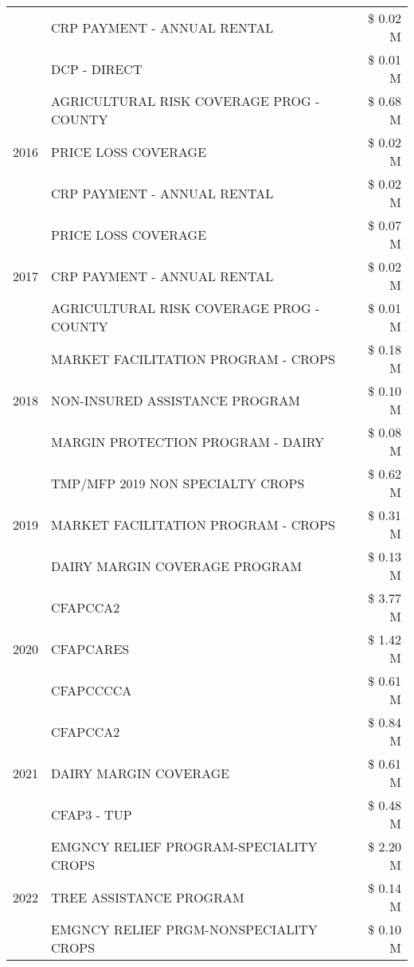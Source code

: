 \begin{tabular}{llr}
 & CRP PAYMENT - ANNUAL RENTAL & \$ 0.02 M \\
 & DCP - DIRECT & \$ 0.01 M \\
\cline{1-3}
\multirow[t]{3}{*}{2016} & AGRICULTURAL RISK COVERAGE PROG - COUNTY & \$ 0.68 M \\
 & PRICE LOSS COVERAGE & \$ 0.02 M \\
 & CRP PAYMENT - ANNUAL RENTAL & \$ 0.02 M \\
\cline{1-3}
\multirow[t]{3}{*}{2017} & PRICE LOSS COVERAGE & \$ 0.07 M \\
 & CRP PAYMENT - ANNUAL RENTAL & \$ 0.02 M \\
 & AGRICULTURAL RISK COVERAGE PROG - COUNTY & \$ 0.01 M \\
\cline{1-3}
\multirow[t]{3}{*}{2018} & MARKET FACILITATION PROGRAM - CROPS & \$ 0.18 M \\
 & NON-INSURED ASSISTANCE PROGRAM & \$ 0.10 M \\
 & MARGIN PROTECTION PROGRAM - DAIRY & \$ 0.08 M \\
\cline{1-3}
\multirow[t]{3}{*}{2019} & TMP/MFP 2019 NON SPECIALTY CROPS & \$ 0.62 M \\
 & MARKET FACILITATION PROGRAM - CROPS & \$ 0.31 M \\
 & DAIRY MARGIN COVERAGE PROGRAM & \$ 0.13 M \\
\cline{1-3}
\multirow[t]{3}{*}{2020} & CFAPCCA2 & \$ 3.77 M \\
 & CFAPCARES & \$ 1.42 M \\
 & CFAPCCCCA & \$ 0.61 M \\
\cline{1-3}
\multirow[t]{3}{*}{2021} & CFAPCCA2 & \$ 0.84 M \\
 & DAIRY MARGIN COVERAGE & \$ 0.61 M \\
 & CFAP3 - TUP & \$ 0.48 M \\
\cline{1-3}
\multirow[t]{3}{*}{2022} & EMGNCY RELIEF PROGRAM-SPECIALITY CROPS & \$ 2.20 M \\
 & TREE ASSISTANCE PROGRAM & \$ 0.14 M \\
 & EMGNCY RELIEF PRGM-NONSPECIALITY CROPS & \$ 0.10 M \\
\cline{1-3}
\bottomrule
\end{tabular}
